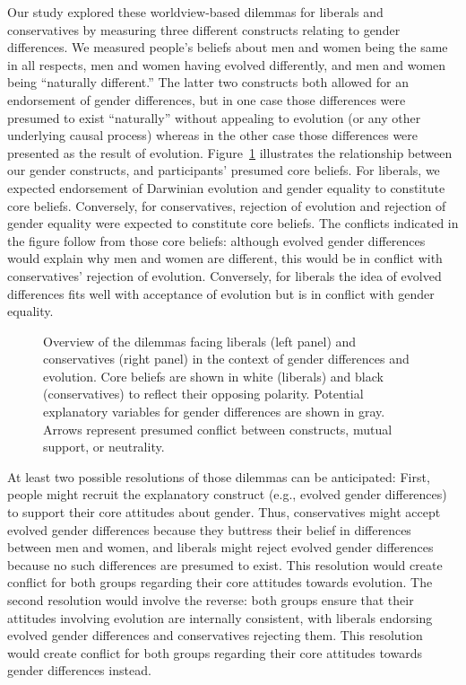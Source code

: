 \documentclass[fignum,man]{apa}\usepackage[]{graphicx}\usepackage[]{color}
\begin{document}
Our study explored these worldview-based dilemmas for
liberals and conservatives by measuring 
three different constructs relating to gender differences.
We measured
people's beliefs about men and women being the same in all
respects, men and women having evolved differently,
and men and women being ``naturally different.'' 
The latter two constructs both allowed for an endorsement
of gender differences, but in one case those differences
were presumed to exist ``naturally'' without appealing
to evolution (or any other underlying causal process) 
whereas in the other case those differences 
were presented as the result of evolution. 
Figure~\ref{fig:dilemmas} illustrates the relationship
between our gender constructs, and participants' presumed
core beliefs. For liberals, we expected endorsement of
Darwinian evolution and gender equality to constitute core beliefs. Conversely,
for conservatives, rejection of evolution and rejection of 
gender equality were expected to constitute core beliefs.
The conflicts indicated in the figure follow from those core
beliefs: although evolved gender differences would explain
why men and women are different, this would be in conflict with
conservatives' rejection of evolution. Conversely,
for liberals the idea of evolved differences fits
well with acceptance of evolution but is in conflict with 
gender equality.
\begin{figure}[tp] %
	\caption{Overview of the dilemmas facing liberals (left panel) and conservatives
	(right panel) in the context of gender differences and evolution. Core beliefs
    are shown in white (liberals) and black (conservatives) to reflect their
	opposing polarity. Potential explanatory variables for gender
	differences are shown in gray. Arrows represent presumed conflict between constructs,
	mutual support, or neutrality. }
	\label{fig:dilemmas}
\end{figure}

At least two possible resolutions of those dilemmas can be anticipated:
First, people might recruit the explanatory construct (e.g., evolved
gender differences) to support their core attitudes about gender. Thus,
conservatives might accept evolved gender differences because they buttress
their belief in differences between men and women, and liberals might
reject evolved gender differences because no such differences are presumed to exist.
This resolution would create conflict for both groups regarding their core attitudes
towards evolution. The second resolution would involve the reverse: both groups 
ensure that their attitudes involving evolution are internally consistent, 
with liberals endorsing
evolved gender differences and conservatives rejecting them. This resolution 
would create conflict for both groups regarding their core attitudes towards 
gender differences instead.
\end{document}
